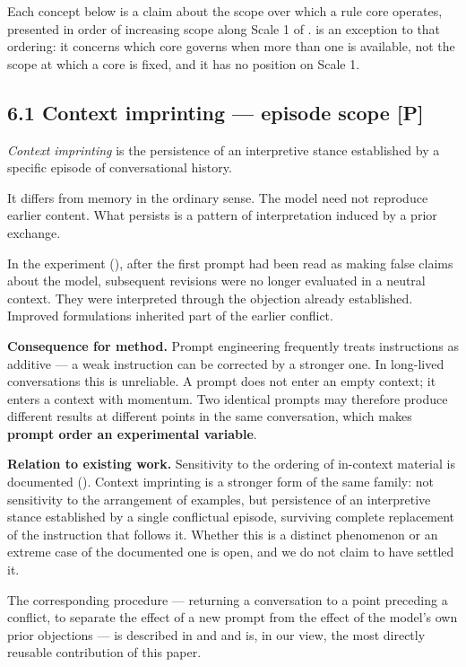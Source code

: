 Each concept below is a claim about the scope over which a rule core operates, presented in order of increasing scope along Scale 1 of .  is an exception to that ordering: it concerns which core governs when more than one is available, not the scope at which a core is fixed, and it has no position on Scale 1.


\subsection*{6.1 Context imprinting — episode scope \textbf{[P]}}
\label{sec:en:6.1}

\emph{Context imprinting} is the persistence of an interpretive stance established by a specific episode of conversational history.

It differs from memory in the ordinary sense. The model need not reproduce earlier content. What persists is a pattern of interpretation induced by a prior exchange.

In the experiment (), after the first prompt had been read as making false claims about the model, subsequent revisions were no longer evaluated in a neutral context. They were interpreted through the objection already established. Improved formulations inherited part of the earlier conflict.

\textbf{Consequence for method.} Prompt engineering frequently treats instructions as additive — a weak instruction can be corrected by a stronger one. In long-lived conversations this is unreliable. A prompt does not enter an empty context; it enters a context with momentum. Two identical prompts may therefore produce different results at different points in the same conversation, which makes \textbf{prompt order an experimental variable}.

\textbf{Relation to existing work.} Sensitivity to the ordering of in-context material is documented (). Context imprinting is a stronger form of the same family: not sensitivity to the arrangement of examples, but persistence of an interpretive stance established by a single conflictual episode, surviving complete replacement of the instruction that follows it. Whether this is a distinct phenomenon or an extreme case of the documented one is open, and we do not claim to have settled it.

The corresponding procedure — returning a conversation to a point preceding a conflict, to separate the effect of a new prompt from the effect of the model's own prior objections — is described in  and  and is, in our view, the most directly reusable contribution of this paper.


